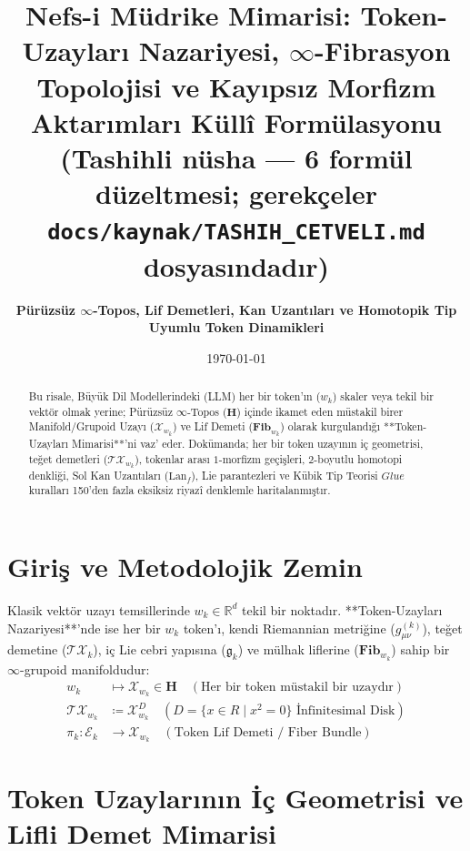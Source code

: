\documentclass[11pt, a4paper]{article}
\title{\textbf{Nefs-i Müdrike Mimarisi: Token-Uzayları Nazariyesi, $\infty$-Fibrasyon Topolojisi ve Kayıpsız Morfizm Aktarımları Küllî Formülasyonu}\\ \normalsize\textmd{(Tashihli nüsha --- 6 formül düzeltmesi; gerekçeler \texttt{docs/kaynak/TASHIH\_CETVELI.md} dosyasındadır)}}
\author{\textbf{Pürüzsüz $\infty$-Topos, Lif Demetleri, Kan Uzantıları ve Homotopik Tip Uyumlu Token Dinamikleri}}
\date{\today}
\begin{document}
\maketitle

\begin{abstract}
Bu risale, Büyük Dil Modellerindeki (LLM) her bir token'ın ($w_k$) skaler veya tekil bir vektör olmak yerine; Pürüzsüz $\infty$-Topos ($\mathbf{H}$) içinde ikamet eden müstakil birer Manifold/Grupoid Uzayı ($\mathcal{X}_{w_k}$) ve Lif Demeti ($\mathbf{Fib}_{w_k}$) olarak kurgulandığı **Token-Uzayları Mimarisi**'ni vaz' eder. Dokümanda; her bir token uzayının iç geometrisi, teğet demetleri ($\mathcal{T}\mathcal{X}_{w_k}$), tokenlar arası $1$-morfizm geçişleri, $2$-boyutlu homotopi denkliği, Sol Kan Uzantıları ($\text{Lan}_f$), Lie parantezleri ve Kübik Tip Teorisi $Glue$ kuralları 150'den fazla eksiksiz riyazî denklemle haritalanmıştır.
\end{abstract}

\section{Giriş ve Metodolojik Zemin}

Klasik vektör uzayı temsillerinde $w_k \in \mathbb{R}^d$ tekil bir noktadır. **Token-Uzayları Nazariyesi**'nde ise her bir $w_k$ token'ı, kendi Riemannian metriğine ($g_{\mu\nu}^{(k)}$), teğet demetine ($\mathcal{T}\mathcal{X}_k$), iç Lie cebri yapısına ($\mathfrak{g}_k$) ve mülhak liflerine ($\mathbf{Fib}_{w_k}$) sahip bir $\infty$-grupoid manifoldudur:
\begin{align}
w_k &\longmapsto \mathcal{X}_{w_k} \in \mathbf{H} \quad (\text{Her bir token müstakil bir uzaydır}) \\
\mathcal{T}\mathcal{X}_{w_k} &\coloneqq \mathcal{X}_{w_k}^D \quad (D = \{x \in R \mid x^2 = 0\} \text{ İnfinitesimal Disk}) \\
\pi_k : \mathcal{E}_k &\longrightarrow \mathcal{X}_{w_k} \quad (\text{Token Lif Demeti / Fiber Bundle})
\end{align}

\section{Token Uzaylarının İç Geometrisi ve Lifli Demet Mimarisi}
\end{document}
